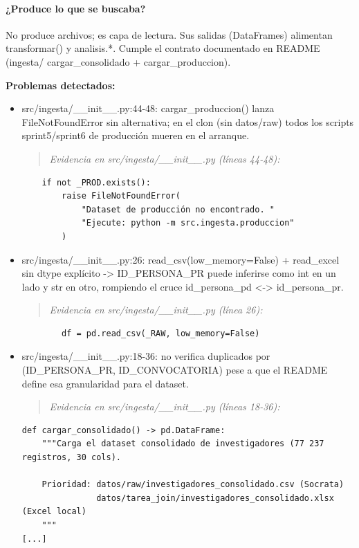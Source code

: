 \paragraph{¿Produce lo que se buscaba?}
No produce archivos; es capa de lectura. Sus salidas (DataFrames) alimentan transformar() y analisis.*. Cumple el contrato documentado en README (ingesta/ cargar\_consolidado + cargar\_produccion).

\begin{tcolorbox}[riesgo]
\textbf{Problemas detectados:}
\begin{itemize}
  \item src/ingesta/\_\_init\_\_.py:44-48: cargar\_produccion() lanza FileNotFoundError sin alternativa; en el clon (sin datos/raw) todos los scripts sprint5/sprint6 de producción mueren en el arranque.
\begin{quote}\footnotesize\ttfamily
\noindent\emph{Evidencia en src/ingesta/\_\_init\_\_.py (líneas 44-48):}
\end{quote}
\begin{lstlisting}
    if not _PROD.exists():
        raise FileNotFoundError(
            "Dataset de producción no encontrado. "
            "Ejecute: python -m src.ingesta.produccion"
        )
\end{lstlisting}

  \item src/ingesta/\_\_init\_\_.py:26: read\_csv(low\_memory=False) + read\_excel sin dtype explícito -> ID\_PERSONA\_PR puede inferirse como int en un lado y str en otro, rompiendo el cruce id\_persona\_pd <-> id\_persona\_pr.
\begin{quote}\footnotesize\ttfamily
\noindent\emph{Evidencia en src/ingesta/\_\_init\_\_.py (línea 26):}
\end{quote}
\begin{lstlisting}
        df = pd.read_csv(_RAW, low_memory=False)
\end{lstlisting}

  \item src/ingesta/\_\_init\_\_.py:18-36: no verifica duplicados por (ID\_PERSONA\_PR, ID\_CONVOCATORIA) pese a que el README define esa granularidad para el dataset.
\begin{quote}\footnotesize\ttfamily
\noindent\emph{Evidencia en src/ingesta/\_\_init\_\_.py (líneas 18-36):}
\end{quote}
\begin{lstlisting}
def cargar_consolidado() -> pd.DataFrame:
    """Carga el dataset consolidado de investigadores (77 237 registros, 30 cols).

    Prioridad: datos/raw/investigadores_consolidado.csv (Socrata)
               datos/tarea_join/investigadores_consolidado.xlsx (Excel local)
    """
[...]
\end{lstlisting}

\end{itemize}
\end{tcolorbox}


